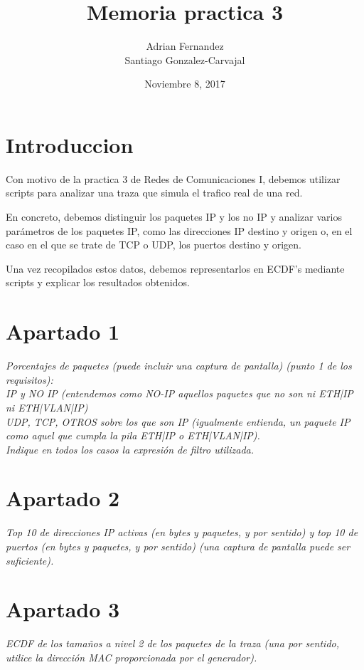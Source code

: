 \documentclass[11pt]{article} %
\begin{document}
\begin{titlepage}
\title{Memoria practica 3}
\date{Noviembre 8, 2017}
\author{Adrian Fernandez \\ Santiago Gonzalez-Carvajal}
\maketitle
\end{titlepage}

\section{Introduccion}

Con motivo de la practica 3 de Redes de Comunicaciones I, debemos utilizar scripts para analizar una traza que simula el trafico real de una red. \par
En concreto, debemos distinguir los paquetes IP y los no IP y analizar varios parámetros de los paquetes IP, como las direcciones IP destino y origen o, en el caso en el que se trate de TCP o UDP, los puertos destino y origen. \par
Una vez recopilados estos datos, debemos representarlos en ECDF's mediante scripts y explicar los resultados obtenidos.

\section{Apartado 1}
\emph{Porcentajes de paquetes (puede incluir una captura de pantalla) (punto 1 de los requisitos):\\
IP y NO IP (entendemos como NO-IP aquellos paquetes que no son ni ETH|IP ni ETH|VLAN|IP)\\
UDP, TCP, OTROS sobre los que son IP (igualmente entienda, un paquete IP como aquel que cumpla la pila ETH|IP o ETH|VLAN|IP).\\
Indique en todos los casos la expresión de filtro utilizada.}
    


\section{Apartado 2}
\emph{Top 10 de direcciones IP activas (en bytes y paquetes, y por sentido) y top 10 de puertos (en bytes y paquetes, y por sentido) (una captura de pantalla puede ser suficiente).}



\section{Apartado 3}
\emph{ECDF de los tamaños a nivel 2 de los paquetes de la traza (una por sentido, utilice la dirección MAC proporcionada por el generador).}
\end{document}
